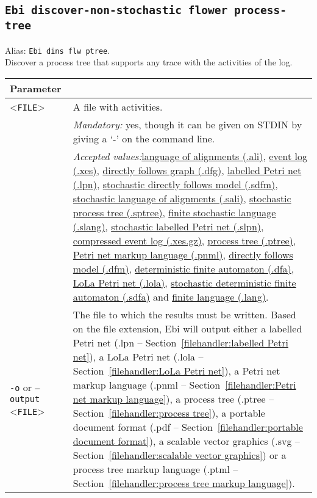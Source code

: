 {\subsection{\texttt{Ebi discover-non-stochastic flower process-tree}}
\label{command:Ebi discover-non-stochastic flower process-tree}
Alias: \texttt{Ebi dins flw ptree}.\\
Discover a process tree that supports any trace with the activities of the log.\\
\begin{tabularx}{\linewidth}{lX}
\toprule
Parameter \\\midrule
<\texttt{FILE}>&A file with activities.\\
&\textit{Mandatory:} \quad yes, though it can be given on STDIN by giving a `-' on the command line.\\
&\textit{Accepted values:}\quad \hyperref[filehandler:language of alignments]{language of alignments (.ali)}, \hyperref[filehandler:event log]{event log (.xes)}, \hyperref[filehandler:directly follows graph]{directly follows graph (.dfg)}, \hyperref[filehandler:labelled Petri net]{labelled Petri net (.lpn)}, \hyperref[filehandler:stochastic directly follows model]{stochastic directly follows model (.sdfm)}, \hyperref[filehandler:stochastic language of alignments]{stochastic language of alignments (.sali)}, \hyperref[filehandler:stochastic process tree]{stochastic process tree (.sptree)}, \hyperref[filehandler:finite stochastic language]{finite stochastic language (.slang)}, \hyperref[filehandler:stochastic labelled Petri net]{stochastic labelled Petri net (.slpn)}, \hyperref[filehandler:compressed event log]{compressed event log (.xes.gz)}, \hyperref[filehandler:process tree]{process tree (.ptree)}, \hyperref[filehandler:Petri net markup language]{Petri net markup language (.pnml)}, \hyperref[filehandler:directly follows model]{directly follows model (.dfm)}, \hyperref[filehandler:deterministic finite automaton]{deterministic finite automaton (.dfa)}, \hyperref[filehandler:LoLa Petri net]{LoLa Petri net (.lola)}, \hyperref[filehandler:stochastic deterministic finite automaton]{stochastic deterministic finite automaton (.sdfa)} and \hyperref[filehandler:finite language]{finite language (.lang)}.\\
\texttt{-o} or \texttt{--output} <\texttt{FILE}> &
The file to which the results must be written. Based on the file extension, Ebi will output either a labelled Petri net (.lpn -- Section~\ref{filehandler:labelled Petri net}), a LoLa Petri net (.lola -- Section~\ref{filehandler:LoLa Petri net}), a Petri net markup language (.pnml -- Section~\ref{filehandler:Petri net markup language}), a process tree (.ptree -- Section~\ref{filehandler:process tree}), a portable document format (.pdf -- Section~\ref{filehandler:portable document format}), a scalable vector graphics (.svg -- Section~\ref{filehandler:scalable vector graphics}) or a process tree markup language (.ptml -- Section~\ref{filehandler:process tree markup language}).

\end{tabularx}}
